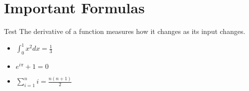 \section{Important Formulas}

\begin{definition}{Test}
    The derivative of a function measures how it changes as its input changes.
\end{definition}

\begin{itemize}
    \item $\int_0^1 x^2 dx = \frac{1}{3}$
    \item $e^{i\pi} + 1 = 0$
    \item $\sum_{i=1}^n i = \frac{n(n+1)}{2}$
\end{itemize}
